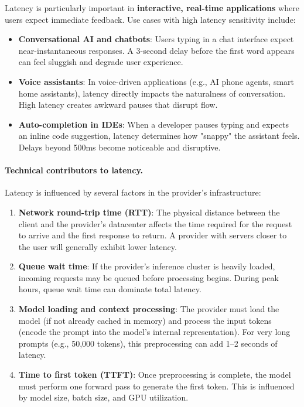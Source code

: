 \documentclass[english]{article}
\begin{document}
Latency is particularly important in \textbf{interactive, real-time applications} where users expect immediate feedback. Use cases with high latency sensitivity include:
\begin{itemize}
    \item \textbf{Conversational AI and chatbots}: Users typing in a chat interface expect near-instantaneous responses. A 3-second delay before the first word appears can feel sluggish and degrade user experience.
    \item \textbf{Voice assistants}: In voice-driven applications (e.g., AI phone agents, smart home assistants), latency directly impacts the naturalness of conversation. High latency creates awkward pauses that disrupt flow.
    \item \textbf{Auto-completion in IDEs}: When a developer pauses typing and expects an inline code suggestion, latency determines how "snappy" the assistant feels. Delays beyond 500ms become noticeable and disruptive.
\end{itemize}

\paragraph{Technical contributors to latency.}

Latency is influenced by several factors in the provider's infrastructure:
\begin{enumerate}
    \item \textbf{Network round-trip time (RTT)}: The physical distance between the client and the provider's datacenter affects the time required for the request to arrive and the first response to return. A provider with servers closer to the user will generally exhibit lower latency.
    \item \textbf{Queue wait time}: If the provider's inference cluster is heavily loaded, incoming requests may be queued before processing begins. During peak hours, queue wait time can dominate total latency.
    \item \textbf{Model loading and context processing}: The provider must load the model (if not already cached in memory) and process the input tokens (encode the prompt into the model's internal representation). For very long prompts (e.g., 50,000 tokens), this preprocessing can add 1--2 seconds of latency.
    \item \textbf{Time to first token (TTFT)}: Once preprocessing is complete, the model must perform one forward pass to generate the first token. This is influenced by model size, batch size, and GPU utilization.
\end{enumerate}
\end{document}
